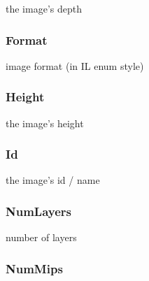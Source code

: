 the image's depth 

\hypertarget{struct_i_l_uinfo_aab6d023e52ab2d90be412df75a42abfb}{
\subsubsection[{Format}]{ Format}}\label{struct_i_l_uinfo_aab6d023e52ab2d90be412df75a42abfb}


image format (in I\+L enum style) 

\hypertarget{struct_i_l_uinfo_a8a8093d76b61a95fc96df24af29b107a}{
\subsubsection[{Height}]{ Height}}\label{struct_i_l_uinfo_a8a8093d76b61a95fc96df24af29b107a}


the image's height 

\hypertarget{struct_i_l_uinfo_aa8396db6e508ed4a5dfc812e6840123d}{
\subsubsection[{Id}]{ Id}}\label{struct_i_l_uinfo_aa8396db6e508ed4a5dfc812e6840123d}


the image's id / name 

\hypertarget{struct_i_l_uinfo_a76780bfd8409518a48a5e0e3d28ff3ae}{
\subsubsection[{Num\+Layers}]{ Num\+Layers}}\label{struct_i_l_uinfo_a76780bfd8409518a48a5e0e3d28ff3ae}


number of layers 

\hypertarget{struct_i_l_uinfo_a157efa5d606d0da51d39a63380255a5a}{
\subsubsection[{Num\+Mips}]{ Num\+Mips}}\label{struct_i_l_uinfo_a157efa5d606d0da51d39a63380255a5a}


